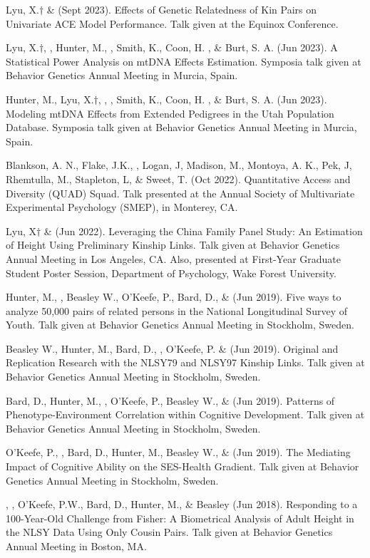 \begin{etaremune}
\item Lyu, X.$\dagger$ \& \meb (Sept 2023). Effects of Genetic Relatedness of Kin Pairs on Univariate ACE Model Performance. Talk given at the Equinox Conference.
\item Lyu, X.$\dagger$, \meb, Hunter, M.,  \Joe, Smith, K., Coon, H. , \& Burt, S. A. (Jun 2023). A Statistical Power Analysis on mtDNA Effects Estimation. Symposia talk given at Behavior Genetics Annual Meeting in Murcia, Spain.
\item Hunter, M., Lyu, X.$\dagger$, \meb,  \Joe, Smith, K., Coon, H. , \& Burt, S. A. (Jun 2023). Modeling mtDNA Effects from Extended Pedigrees in the Utah Population Database. Symposia talk given at Behavior Genetics Annual Meeting in Murcia, Spain.
\item  Blankson, A. N., Flake, J.K., \meb, Logan, J, Madison, M., Montoya, A. K., Pek, J, Rhemtulla, M., Stapleton, L, \& Sweet, T. (Oct 2022). Quantitative Access and Diversity (QUAD) Squad. Talk presented at the Annual Society of Multivariate Experimental Psychology (SMEP), in Monterey, CA.
\item Lyu, X$\dagger$ \& \meb (Jun 2022). Leveraging the China Family Panel Study: An Estimation of Height Using Preliminary Kinship Links. Talk given at Behavior Genetics Annual Meeting in Los Angeles, CA. Also, presented at First-Year Graduate Student Poster Session, Department of Psychology, Wake Forest University.
%
\item Hunter, M., \meb, Beasley W., O'Keefe, P.,  Bard, D., \& \Joe (Jun 2019). Five ways to analyze 50,000 pairs of related persons in the National Longitudinal Survey of Youth. Talk given at Behavior Genetics Annual Meeting in Stockholm, Sweden. 
%
\item Beasley W., Hunter, M., Bard, D., \meb, O'Keefe, P. \&  \Joe (Jun 2019). Original and Replication Research with the NLSY79 and NLSY97 Kinship Links. Talk given at Behavior Genetics Annual Meeting in Stockholm, Sweden. 
%
\item Bard, D., Hunter, M., \meb, O'Keefe, P., Beasley W.,  \&  \Joe (Jun 2019). Patterns of Phenotype-Environment Correlation within Cognitive Development. Talk given at Behavior Genetics Annual Meeting in Stockholm, Sweden. 
%
\item O'Keefe, P., \meb, Bard, D., Hunter, M.,  Beasley W.,  \&  \Joe (Jun 2019). The Mediating Impact of Cognitive Ability on the SES-Health Gradient. Talk given at Behavior Genetics Annual Meeting in Stockholm, Sweden. 
%
\item\Joe, \meb, O'Keefe, P.W., Bard, D., Hunter, M., \& Beasley (Jun 2018). Responding to a 100-Year-Old Challenge from Fisher: A Biometrical Analysis of Adult Height in the NLSY Data Using Only Cousin Pairs. Talk given at Behavior Genetics Annual Meeting in Boston, MA. 


\end{etaremune}

